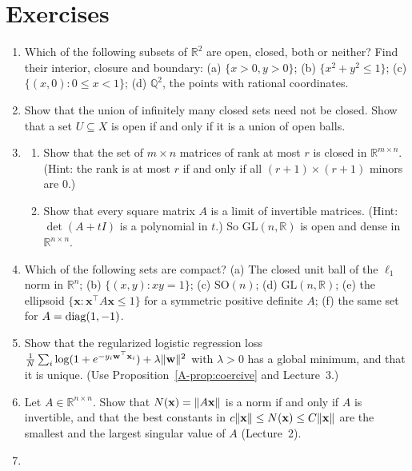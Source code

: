 \section*{Exercises}
\begin{enumerate}[leftmargin=*]
    \item Which of the following subsets of $\mathbb{R}^2$ are open, closed, both or neither? Find their interior, closure and boundary: (a) $\{x > 0, y > 0\}$; (b) $\{x^2 + y^2 \leq 1\}$; (c) $\{(x, 0) : 0 \leq x < 1\}$; (d) $\mathbb{Q}^2$, the points with rational coordinates.
    \item Show that the union of infinitely many closed sets need not be closed. Show that a set $U \subseteq X$ is open if and only if it is a union of open balls.
    \item \begin{enumerate}[label=(\alph*)]
        \item Show that the set of $m \times n$ matrices of rank at most $r$ is closed in $\mathbb{R}^{m \times n}$. (Hint: the rank is at most $r$ if and only if all $(r + 1) \times (r + 1)$ minors are $0$.)
        \item Show that every square matrix $A$ is a limit of invertible matrices. (Hint: $\det(A + tI)$ is a polynomial in $t$.) So $\mathrm{GL}(n, \mathbb{R})$ is open and dense in $\mathbb{R}^{n \times n}$.
    \end{enumerate}
    \item Which of the following sets are compact? (a) The closed unit ball of the $\ell_1$ norm in $\mathbb{R}^n$; (b) $\{(x, y) : xy = 1\}$; (c) $\mathrm{SO}(n)$; (d) $\mathrm{GL}(n, \mathbb{R})$; (e) the ellipsoid $\{\mathbf{x} : \mathbf{x}^\top A\mathbf{x} \leq 1\}$ for a symmetric positive definite $A$; (f) the same set for $A = \operatorname{diag}(1, -1)$.
    \item Show that the regularized logistic regression loss $\frac{1}{N}\sum_i \log(1 + e^{-y_i\mathbf{w}^\top\mathbf{x}_i}) + \lambda\lVert \mathbf{w} \rVert^2$ with $\lambda > 0$ has a global minimum, and that it is unique. (Use Proposition~\ref{A-prop:coercive} and Lecture~3.)
    \item Let $A \in \mathbb{R}^{n \times n}$. Show that $N(\mathbf{x}) = \lVert A\mathbf{x} \rVert$ is a norm if and only if $A$ is invertible, and that the best constants in $c\lVert \mathbf{x} \rVert \leq N(\mathbf{x}) \leq C\lVert \mathbf{x} \rVert$ are the smallest and the largest singular value of $A$ (Lecture~2).
    \item \begin{enumerate}[label=(\alph*)]

\end{enumerate}
\end{enumerate}
